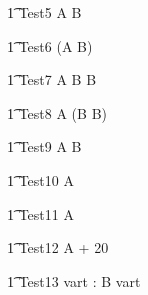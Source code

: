 
\begin{circusaction}
   \t1 Test5 \circdef  {} \rcirctime \circstartby A  \circseq B\\
\end{circusaction}

\begin{circusaction}
   \t1 Test6 \circdef  {} \rcirctime \circstartby (A  \circseq B)\\
\end{circusaction}

\begin{circusaction}
   \t1 Test7 \circdef  A \circseq B \circseq {} \rcirctime \circstartby B\\
\end{circusaction}

\begin{circusaction}
   \t1 Test8 \circdef  A \circseq (B \circseq {} \rcirctime \circstartby B)\\
\end{circusaction}

\begin{circusaction}
   \t1 Test9 \circdef  {} \rcirctime \circstartby A \circseq {} \rcirctime \circstartby B\\
\end{circusaction}



\begin{circusaction}
   \t1 Test10 \circdef  A \circendby {} \rcirctime   \\
\end{circusaction}

\begin{circusaction}
   \t1 Test11 \circdef  A \circendby {}  \rcirctime  \\
\end{circusaction}

\begin{circusaction}
   \t1 Test12 \circdef  A \circendby {} + 20 \rcirctime   \\
\end{circusaction}

\begin{circusaction}
   \t1 Test13 \circdef \circvres vart : \nat  \circspot  B \circendby \lcirctime vart \rcirctime  \\
\end{circusaction}


